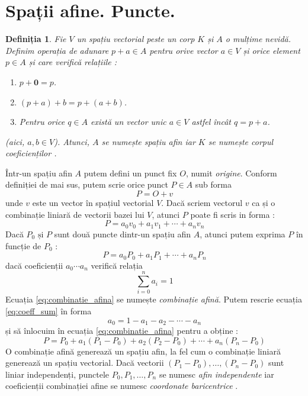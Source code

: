 \section{Spații afine. Puncte.}
\label{ch1:affine_spaces}

\newtheorem{th_affine_spaces}{Definiția}
\begin{th_affine_spaces}
Fie $V$ un spațiu vectorial peste un corp $K$ și $A$ o mulțime nevidă. Definim
operația de adunare $p + a \in A$ pentru orive vector $a \in V$ și orice element
$p \in A$ și care verifică relațiile :
\begin{enumerate}
  \item $p + \mathbf{0} = p$.
  \item $(p + a) + b = p + (a + b)$.
  \item Pentru orice $q \in A$ există un vector unic $a \in V$ astfel încât
        $q = p + a$.
\end{enumerate} (aici, $a, b \in V$). Atunci, $A$ se numește spațiu afin
iar $K$ se numește corpul coeficienților \cite{WolframAlpha}.
\end{th_affine_spaces}

Într-un spațiu afin $A$ putem defini un punct fix $O$, numit \textit{origine}.
Conform definiției de mai sus, putem scrie orice punct $P \in A$ sub forma
\begin{equation}
P = O + v
\end{equation} unde $v$ este un vector în spațiul vectorial $V$. Dacă scriem
vectorul $v$ ca și o combinație liniară de vectorii bazei lui $V$, atunci $P$
poate fi scris in forma :
\begin{equation}
P = a_{0}v_{0} + a_{1}v_{1} + \cdots + a_{n}v_{n}
\end{equation}
Dacă $P_{0} \text{ și } P$ sunt două puncte dintr-un spațiu afin $A$, atunci
putem exprima $P$ în funcție de $P_{0}$ :
\begin{equation}
\label{eq:combinatie_afina}
P = a_{0}P_{0} + a_{1}P_{1} + \cdots + a_{n}P_{n}
\end{equation} dacă coeficienții $a_{0} \cdots a_{n}$ verifică relația
\begin{equation}
\label{eq:coeff_sum}
\sum_{i = 0}^{n}a_{i} = 1
\end{equation}
Ecuația \eqref{eq:combinatie_afina} se numește \textit{combinație afină}.
Putem rescrie ecuația \eqref{eq:coeff_sum} în forma
\begin{equation}
a_{0} = 1 - a_{1} - a_{2} - \cdots - a_{n}
\end{equation} și să înlocuim în ecuația \eqref{eq:combinatie_afina} pentru a
obține :
\begin{equation}
P = P_{0} + a_{1}(P_{1} - P_{0}) + a_{2}(P_{2} - P_{0}) + \cdots +
    a_{n}(P_{n} - P_{0})
\end{equation}
O combinație afină generează un spațiu afin, la fel cum o combinație liniară
generează un spațiu vectorial. Dacă vectorii 
$(P{_1} - P_{0}), \dots , (P_{n} - P_{0})$
sunt liniar independenți, punctele $P_{0}, P_{1}, \dots , P_{n}$ se numesc
\textit{afin independente} iar coeficienții combinației afine se numesc 
\textit{coordonate baricentrice} .
